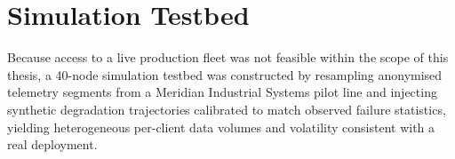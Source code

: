 \section{Simulation Testbed}
Because access to a live production fleet was not feasible within the scope of this
thesis, a 40-node simulation testbed was constructed by resampling anonymised telemetry
segments from a Meridian Industrial Systems pilot line and injecting synthetic
degradation trajectories calibrated to match observed failure statistics, yielding
heterogeneous per-client data volumes and volatility consistent with a real deployment.
